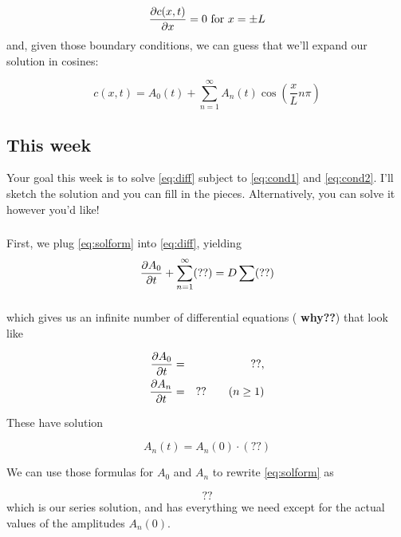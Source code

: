 \documentclass[12pt]{article}
\begin{document}
\begin{equation}
\label{eq:cond2}
  \frac{\partial c(x,t)}{\partial x} = 0 \text{ for }x=\pm L
\end{equation}
and, given those boundary conditions, we can guess that we'll expand
our solution in cosines:


\begin{equation}
  \label{eq:solform}
  c(x,t) = A_0(t) + \sum_{n=1}^\infty A_n(t)\cos\left(\frac{x}{L}n\pi\right)
\end{equation}

\subsection{This week}
Your goal this week is to solve \eqref{eq:diff} subject to
\eqref{eq:cond1} and \eqref{eq:cond2}. I'll sketch the solution and
you can fill in the pieces. Alternatively, you can solve it however
you'd like!



\subsubsection{}
First, we plug \eqref{eq:solform} into \eqref{eq:diff}, yielding
\begin{equation}
  \frac{\partial A_0}{\partial t} + \sum_{n=1}^{\infty}(??) = D\sum(??)
\end{equation}

\subsubsection{}
which gives us an infinite number of differential equations ({\bf
  why??}) that look like


\begin{eqnarray}
  \frac{\partial A_0}{\partial t} &=& ??,\\
  \frac{\partial A_n}{\partial t} &=& ??\qquad (n\ge 1)
\end{eqnarray}

These have solution

\begin{equation}
  A_n(t) = A_n(0)\cdot(??)
\end{equation}

We can use those formulas for $A_0$ and $A_n$ to rewrite
\eqref{eq:solform} as

\begin{equation}
\label{eq:solform2}
  ??
\end{equation}
which is our series solution, and has everything we need except for
the actual values of the amplitudes $A_n(0)$.
\end{document}
